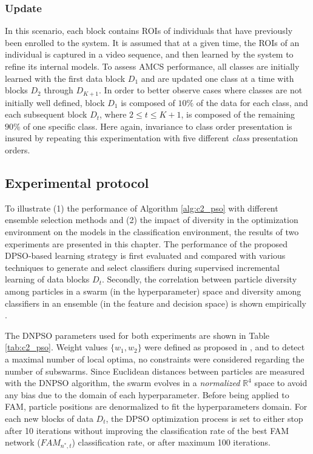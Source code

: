 \subsubsection{Update}

In this scenario, each block contains ROIs of individuals that have previously been enrolled to the system.
It is assumed that at a given time, the ROIs of an individual is captured in a video sequence, and then learned by the system to refine its internal models.
To assess AMCS performance, all classes are initially learned with the first data block $D_1$ and are updated one class at a time with blocks $D_2$ through $D_{K+1}$.
In order to better observe cases where classes are not initially well defined,
block $D_1$ is composed of $10\%$ of the data for each class, and each subsequent block $D_t$, where $2 \leq t \leq K+1$, is composed of the remaining $90\%$ of one specific class.
Here again, invariance to class order presentation is insured by repeating this experimentation with five different \emph{class} presentation orders.

\subsection{Experimental protocol}
\label{sec:c2_protocol}

To illustrate (1) the performance of Algorithm \ref{alg:c2_pso} with different ensemble selection methods and (2) the impact of diversity in the optimization environment on the models in the classification environment, the results of two experiments are presented in this chapter.
The performance of the proposed DPSO-based learning strategy is first evaluated and compared with various techniques to generate and select classifiers during supervised incremental learning of data blocks $D_t$.
Secondly, the correlation between particle diversity among particles in a swarm (in the hyperparameter) space and diversity among classifiers in an ensemble (in the feature and decision space) is shown empirically .

The DNPSO parameters used for both experiments are shown in Table \ref{tab:c2_pso}.
Weight values $\{w_1,w_2\}$ were defined as proposed in \cite{kennedy07}, and to detect a maximal number of local optima, no constraints were considered regarding the number of subswarms.
Since Euclidean distances between particles are measured with the DNPSO algorithm, the swarm evolves in a \emph{normalized} $\mathbb{R}^4$ space to avoid any bias due to the domain of each hyperparameter.
Before being applied to FAM, particle positions are denormalized to fit the hyperparameters domain.
For each new blocks of data $D_t$, the DPSO optimization process is set to either stop after 10 iterations without improving the classification rate of the best FAM network ($\textit{FAM}_{n^*,t}$) classification rate, or after maximum 100 iterations.

